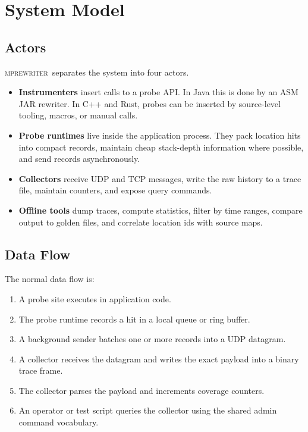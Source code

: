 \documentclass[11pt]{article}
\newcommand{\tool}{\textsc{mprewriter}}
\begin{document}
\section{System Model}

\subsection{Actors}

\tool\ separates the system into four actors.

\begin{itemize}
  \item \textbf{Instrumenters} insert calls to a probe API. In Java this is
  done by an ASM JAR rewriter. In C++ and Rust, probes can be inserted by
  source-level tooling, macros, or manual calls.

  \item \textbf{Probe runtimes} live inside the application process. They pack
  location hits into compact records, maintain cheap stack-depth information
  where possible, and send records asynchronously.

  \item \textbf{Collectors} receive UDP and TCP messages, write the raw
  history to a trace file, maintain counters, and expose query commands.

  \item \textbf{Offline tools} dump traces, compute statistics, filter by time
  ranges, compare output to golden files, and correlate location ids with
  source maps.
\end{itemize}

\subsection{Data Flow}

The normal data flow is:

\begin{enumerate}
  \item A probe site executes in application code.
  \item The probe runtime records a hit in a local queue or ring buffer.
  \item A background sender batches one or more records into a UDP datagram.
  \item A collector receives the datagram and writes the exact payload into a
  binary trace frame.
  \item The collector parses the payload and increments coverage counters.
  \item An operator or test script queries the collector using the shared admin
  command vocabulary.
\end{enumerate}
\end{document}
